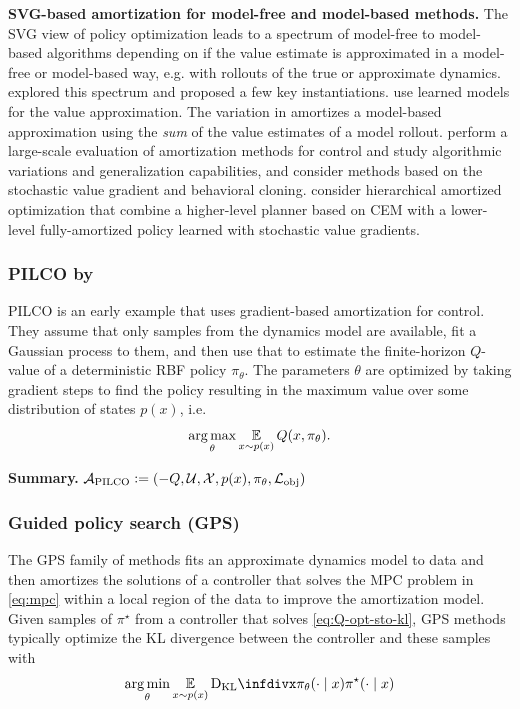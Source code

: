 \documentclass[twoside,11pt]{article}
\newcommand{\eg}{e.g.\xspace}
\newcommand{\ie}{i.e.\xspace}
\begin{document}
\textbf{SVG-based amortization for model-free and model-based methods.}
The SVG view of policy optimization leads to a spectrum of model-free
to model-based algorithms depending on if the value estimate is
approximated in a model-free or model-based way, \eg with rollouts
of the true or approximate dynamics.
\citet{heess2015learning} explored this spectrum and proposed
a few key instantiations.
\citet{byravan2019imagined,amos2021model} use learned
models for the value approximation.
The variation in \citet{hafner2019dream} amortizes a model-based
approximation using the \emph{sum} of the value estimates
of a model rollout.
\citet{byravan2021evaluating} perform a large-scale evaluation of
amortization methods for control and study algorithmic variations
and generalization capabilities, and consider methods based on
the stochastic value gradient and behavioral cloning.
\citet{xie2020latent} consider hierarchical amortized optimization
that combine a higher-level planner based on CEM with a
lower-level fully-amortized policy learned
with stochastic value gradients.

\subsubsection{PILCO by \citet{deisenroth2011pilco}}
PILCO is an early example that uses gradient-based
amortization for control.
They assume that only samples from the dynamics model are
available, fit a Gaussian process to them, and then use that
to estimate the finite-horizon $Q$-value of a
deterministic RBF policy $\pi_\theta$.
The parameters $\theta$ are optimized by taking gradient
steps to find the policy resulting in the maximum value
over some distribution of states $p(x)$, \ie
\begin{equation}
  \operatorname*{arg\,max}_\theta \operatorname*{\mathbb{E}}_{x\sim p(x)} Q(x, \pi_\theta).
\end{equation}

\textbf{Summary.}
${\mathcal{A}}_{\rm PILCO}\vcentcolon= (-Q, {\mathcal{U}}, {\mathcal{X}}, p(x), \pi_\theta, {\mathcal{L}}_{\rm obj})$

\subsubsection{Guided policy search (GPS)}
The GPS family of methods
\citep{levine2013guided,levine2014learning,levine2016end,montgomery2016guided}
fits an approximate dynamics model to data and then
amortizes the solutions of a controller that solves
the MPC problem in \cref{eq:mpc} within a local region of
the data to improve the amortization model.
Given samples of $\pi^\star$ from a controller that solves
\cref{eq:Q-opt-sto-kl},
GPS methods typically optimize the KL divergence between
the controller and these samples with
\begin{equation}
  \argmin_\theta \E_{x\sim p(x)} \kl{\pi_\theta(\cdot\mid x)}{\pi^\star(\cdot\mid x)}
  \label{eq:gps}
\end{equation}
\end{document}
